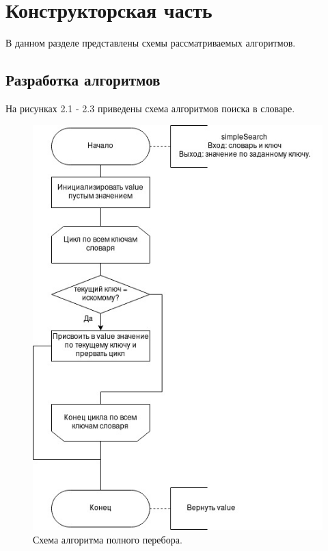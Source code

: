 \documentclass[12pt]{report}
\begin{document}
\chapter{Конструкторская часть}
	
В данном разделе представлены схемы рассматриваемых алгоритмов.
	
\section{Разработка алгоритмов}
	
На рисунках 2.1 - 2.3 приведены схема алгоритмов поиска в словаре.
	
	\begin{figure}[H]
		\centering
		\includegraphics[scale=0.62]{simple_search.jpg}
		\caption{Схема алгоритма полного перебора.}
		\label{fig:mpr}
	\end{figure}
	
\end{document}
